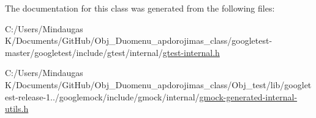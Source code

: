 The documentation for this class was generated from the following files\+:\begin{DoxyCompactItemize}
\item 
C\+:/\+Users/\+Mindaugas K/\+Documents/\+Git\+Hub/\+Obj\+\_\+\+Duomenu\+\_\+apdorojimas\+\_\+class/googletest-\/master/googletest/include/gtest/internal/\mbox{\hyperlink{googletest-master_2googletest_2include_2gtest_2internal_2gtest-internal_8h}{gtest-\/internal.\+h}}\item 
C\+:/\+Users/\+Mindaugas K/\+Documents/\+Git\+Hub/\+Obj\+\_\+\+Duomenu\+\_\+apdorojimas\+\_\+class/\+Obj\+\_\+test/lib/googletest-\/release-\/1../googlemock/include/gmock/internal/\mbox{\hyperlink{gmock-generated-internal-utils_8h}{gmock-\/generated-\/internal-\/utils.\+h}}\end{DoxyCompactItemize}
